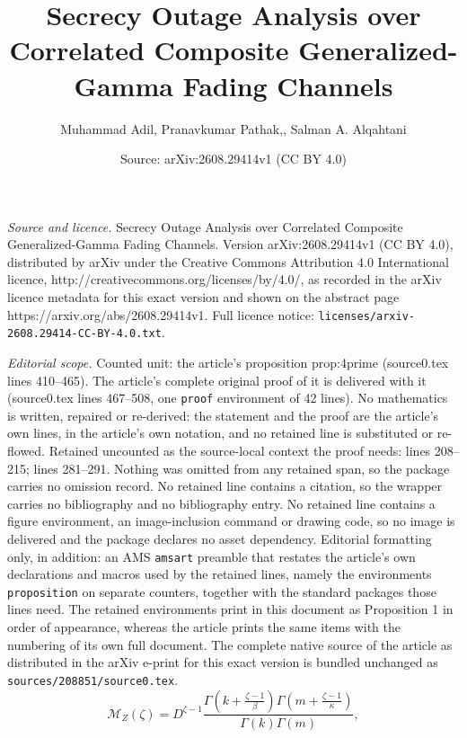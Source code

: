 \documentclass[10pt,a4paper]{amsart}
\title{Secrecy Outage Analysis over Correlated Composite Generalized-Gamma Fading Channels}
\author{Muhammad Adil, Pranavkumar Pathak,, Salman A. Alqahtani}
\date{Source: arXiv:2608.29414v1 (CC BY 4.0)}
\begin{document}
\maketitle

\noindent\emph{Source and licence.} Secrecy Outage Analysis over Correlated Composite Generalized-Gamma Fading Channels. Version arXiv:2608.29414v1 (CC BY 4.0), distributed by arXiv under the Creative Commons Attribution 4.0 International licence, http://creativecommons.org/licenses/by/4.0/, as recorded in the arXiv licence metadata for this exact version and shown on the abstract page https://arxiv.org/abs/2608.29414v1. Full licence notice: \texttt{licenses/arxiv-2608.29414-CC-BY-4.0.txt}.\par\smallskip

\noindent\textit{Editorial scope.} Counted unit: the article's proposition prop:4prime (source0.tex lines 410--465). The article's complete original proof of it is delivered with it (source0.tex lines 467--508, one \texttt{proof} environment of 42 lines). No mathematics is written, repaired or re-derived: the statement and the proof are the article's own lines, in the article's own notation, and no retained line is substituted or re-flowed.  Retained uncounted as the source-local context the proof needs: lines 208--215; lines 281--291.  Nothing was omitted from any retained span, so the package carries no omission record.  No retained line contains a citation, so the wrapper carries no bibliography and no bibliography entry.  No retained line contains a figure environment, an image-inclusion command or drawing code, so no image is delivered and the package declares no asset dependency.  Editorial formatting only, in addition: an AMS \texttt{amsart} preamble that restates the article's own declarations and macros used by the retained lines, namely the environments \texttt{proposition} on separate counters, together with the standard packages those lines need.  The retained environments print in this document as Proposition 1 in order of appearance, whereas the article prints the same items with the numbering of its own full document.  The complete native source of the article as distributed in the arXiv e-print for this exact version is bundled unchanged as \texttt{sources/208851/source0.tex}.
\begin{equation}
\mathcal M_Z(\zeta)
=D^{\zeta-1}
\frac{\Gamma\!\left(k+\frac{\zeta-1}{\beta}\right)
\Gamma\!\left(m+\frac{\zeta-1}{\kappa}\right)}
{\Gamma(k)\Gamma(m)},
\label{eq:MZ}
\end{equation}
\end{document}
